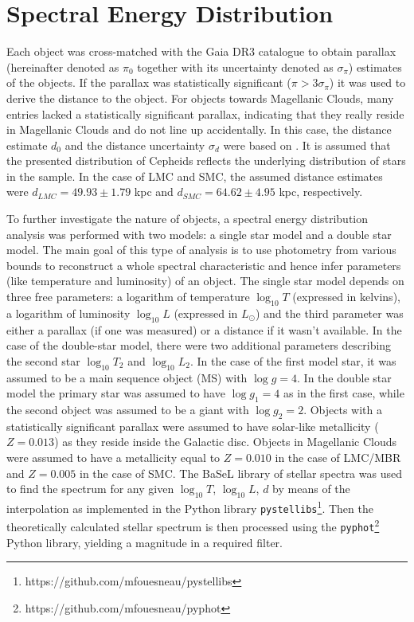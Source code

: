 \documentclass{pracalicmgr}
\begin{document}
\section{Spectral Energy Distribution}
Each object was cross-matched with the Gaia DR3 catalogue to obtain parallax (hereinafter denoted as $\pi_0$ together with its uncertainty denoted as $\sigma_{\pi}$) estimates of the objects. If the parallax was statistically significant ($\pi>3\sigma_{\pi}$)
it was used to derive the distance to the object. For objects towards Magellanic Clouds, many entries lacked a statistically significant parallax, indicating that they really reside in Magellanic Clouds
and do not line up accidentally.
In this case, the distance estimate $d_0$ and the distance uncertainty $\sigma_d$ were based on \citet{jacyszyn-dobrzeniecka_ogle-ing_2016}. It is assumed that the presented distribution
of Cepheids reflects the underlying distribution of stars in the sample.
In the case of LMC and SMC, the assumed distance estimates were $d_{LMC}=49.93\pm1.79$ kpc and $d_{SMC}=64.62\pm4.95$ kpc, respectively. 

To further investigate the nature of objects, a spectral energy distribution analysis was
performed with two models: a single star model and a double star model. The main goal of this type of analysis is to use photometry from various bounds to
reconstruct a whole spectral characteristic and hence infer parameters (like temperature and luminosity) of an object.
The single star model depends on three free parameters: a logarithm of temperature $\log_{10}T$ (expressed in kelvins), a logarithm of luminosity $\log_{10} L$ (expressed in $L_{\odot}$) and the third
parameter was either a parallax (if one was measured) or a distance if it wasn't available. In the case of the double-star model, there were two additional parameters describing the
second star $\log_{10} T_2$ and $\log_{10} L_2$. In the case of the first model star, it was assumed to be a main sequence object (MS) with $\log{g}=4$. In the double star model the primary star
was assumed to have $\log{g_1}=4$ as in the first case, while the second object was assumed to be a giant with $\log{g_2}=2$. Objects with a statistically significant parallax were assumed to have solar-like
metallicity ($Z=0.013$) as they reside inside the Galactic disc. Objects in Magellanic Clouds
were assumed to have a metallicity equal to $Z=0.010$ in the case of LMC/MBR and $Z=0.005$ in the case of SMC.
The BaSeL library of stellar spectra \citep{lejeune_standard_1998} was used to find the spectrum for any given $\log_{10}{T}$, $\log_{10} L$, $d$ 
by means of the interpolation as implemented in the Python library
\texttt{pystellibs}\footnote{https://github.com/mfouesneau/pystellibs}.
Then the theoretically calculated stellar spectrum is then processed using the \texttt{pyphot}\footnote{https://github.com/mfouesneau/pyphot} 
Python library, yielding a magnitude in a required filter.
\end{document}
